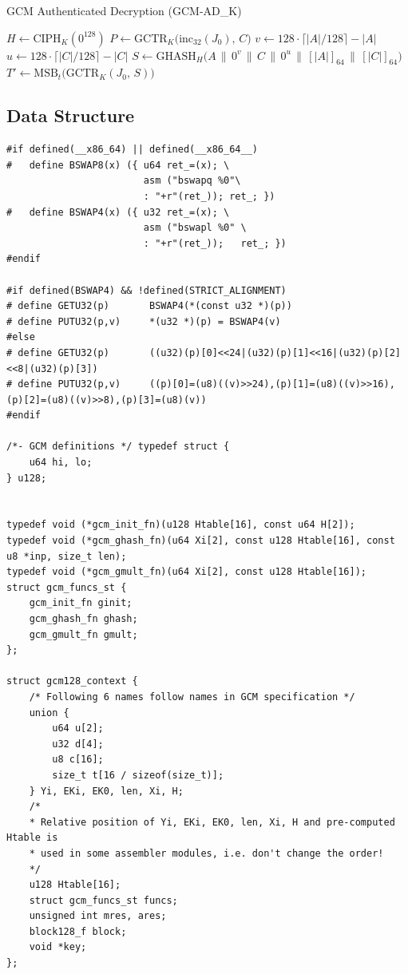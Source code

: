 \begin{algorithm}[H]
\caption{GCM Authenticated Decryption (GCM-AD\_K)}\label{alg:gcm-ad}
$H \gets \mathrm{CIPH}_K(0^{128})$\;
$P \gets \mathrm{GCTR}_K\bigl(\mathrm{inc}_{32}(J_0),\,C\bigr)$\;
\BlankLine
$v \gets 128\cdot\lceil|A|/128\rceil - |A|$\;\quad
$u \gets128\cdot\lceil|C|/128\rceil - |C|$\;
$S \gets \mathrm{GHASH}_H\bigl(A\,\|\,0^v\,\|\,C\,\|\,0^u\,\|\,[\!|A|\!]_{64}\,\|\,[\!|C|\!]_{64}\bigr)$\;
$T' \gets \mathrm{MSB}_t\bigl(\mathrm{GCTR}_K(J_0,\,S)\bigr)$\;
\end{algorithm}

\newpage
\subsection{Data Structure}
\begin{lstlisting}[style=cstyle]
#if defined(__x86_64) || defined(__x86_64__)
#	define BSWAP8(x) ({ u64 ret_=(x); \
						asm ("bswapq %0"\
						: "+r"(ret_)); ret_; })
#   define BSWAP4(x) ({ u32 ret_=(x); \
						asm ("bswapl %0" \
						: "+r"(ret_));   ret_; })
#endif

#if defined(BSWAP4) && !defined(STRICT_ALIGNMENT)
# define GETU32(p)       BSWAP4(*(const u32 *)(p))
# define PUTU32(p,v)     *(u32 *)(p) = BSWAP4(v)
#else
# define GETU32(p)       ((u32)(p)[0]<<24|(u32)(p)[1]<<16|(u32)(p)[2]<<8|(u32)(p)[3])
# define PUTU32(p,v)     ((p)[0]=(u8)((v)>>24),(p)[1]=(u8)((v)>>16),(p)[2]=(u8)((v)>>8),(p)[3]=(u8)(v))
#endif

/*- GCM definitions */ typedef struct {
	u64 hi, lo;
} u128;


typedef void (*gcm_init_fn)(u128 Htable[16], const u64 H[2]);
typedef void (*gcm_ghash_fn)(u64 Xi[2], const u128 Htable[16], const u8 *inp, size_t len);
typedef void (*gcm_gmult_fn)(u64 Xi[2], const u128 Htable[16]);
struct gcm_funcs_st {
	gcm_init_fn ginit;
	gcm_ghash_fn ghash;
	gcm_gmult_fn gmult;
};	
	
struct gcm128_context {
	/* Following 6 names follow names in GCM specification */
	union {
		u64 u[2];
		u32 d[4];
		u8 c[16];
		size_t t[16 / sizeof(size_t)];
	} Yi, EKi, EK0, len, Xi, H;
	/*
	* Relative position of Yi, EKi, EK0, len, Xi, H and pre-computed Htable is
	* used in some assembler modules, i.e. don't change the order!
	*/
	u128 Htable[16];
	struct gcm_funcs_st funcs;
	unsigned int mres, ares;
	block128_f block;
	void *key;
};
\end{lstlisting}

